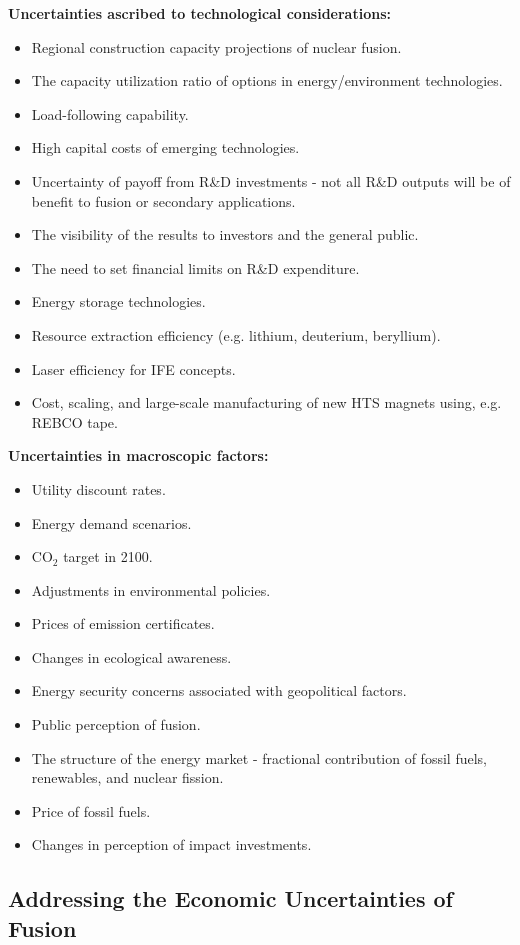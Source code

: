 \textbf{Uncertainties ascribed to technological considerations:}
\begin{itemize}
\item Regional construction capacity projections of nuclear fusion.
 \item The capacity utilization ratio of options in energy/environment technologies.
 \item Load-following capability.
 \item High capital costs of emerging technologies.
 \item Uncertainty of payoff from R\&D investments - not all R\&D outputs will be of benefit to fusion or secondary applications.
 \item The visibility of the results to investors and the general public.
 \item The need to set financial limits on R\&D expenditure.
 \item Energy storage technologies.
 \item Resource extraction efficiency (e.g. lithium, deuterium, beryllium).
 \item Laser efficiency for IFE concepts.
 \item Cost, scaling, and large-scale manufacturing of new HTS magnets using, e.g. REBCO tape.
\end{itemize}
 

\textbf{Uncertainties in macroscopic factors:}
\begin{itemize}
\item Utility discount rates.
 \item Energy demand scenarios.
 \item CO$_2$ target in 2100.
 \item Adjustments in environmental policies.
 \item Prices of emission certificates.
 \item Changes in ecological awareness.
 \item Energy security concerns associated with geopolitical factors.
 \item Public perception of fusion.
 \item The structure of the energy market - fractional contribution of fossil fuels, renewables, and nuclear fission.
 \item Price of fossil fuels.
 \item Changes in perception of impact investments.
\end{itemize}
 

\subsection{Addressing the Economic Uncertainties of Fusion}

